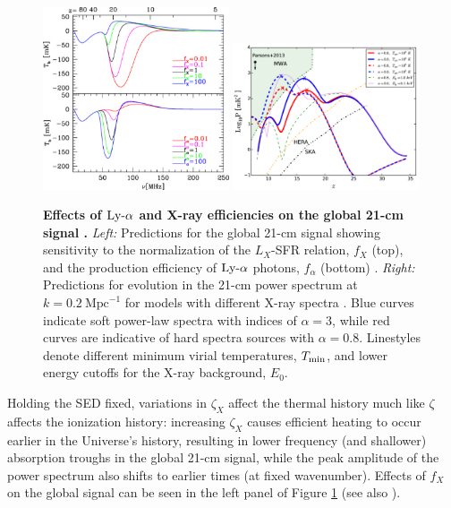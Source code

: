 \begin{figure}[]
\begin{center}
\includegraphics[width=0.49\textwidth]{Mirocha/pritchard2012_fafX.pdf}
\includegraphics[width=0.49\textwidth]{Mirocha/pacucci2014_fig5.pdf}
\end{center}
\caption{{\bf Effects of $\text{Ly-}\alpha$ and X-ray efficiencies on the global 21-cm signal \cite{Pritchard2010,Pacucci2014}.} \textit{Left:} Predictions for the global 21-cm signal showing sensitivity to the normalization of the $L_X$-SFR relation, $f_X$ (top), and the production efficiency of $\text{Ly-}\alpha$ photons, $f_{\alpha}$ (bottom) \cite{Pritchard2010}. \textit{Right:} Predictions for evolution in the 21-cm power spectrum at $k=0.2 \ \mathrm{Mpc}^{-1}$ for models with different X-ray spectra \cite{Pacucci2014}. Blue curves indicate soft power-law spectra with indices of $\alpha=3$, while red curves are indicative of hard spectra sources with $\alpha=0.8$. Linestyles denote different minimum virial temperatures, $T_{\min}$, and lower energy cutoffs for the X-ray background, $E_0$.}
\label{fig:fX}
\end{figure}

Holding the SED fixed, variations in $\zeta_X$ affect the thermal history much like $\zeta$ affects the ionization history: increasing $\zeta_X$ causes efficient heating to occur earlier in the Universe's history, resulting in lower frequency (and shallower) absorption troughs in the global 21-cm signal, while the peak amplitude of the power spectrum also shifts to earlier times (at fixed wavenumber). Effects of $f_X$ on the global signal can be seen in the left panel of Figure \ref{fig:fX} (see also \cite{Mirabel2011,Mirocha2014,Fialkov2014b}).

